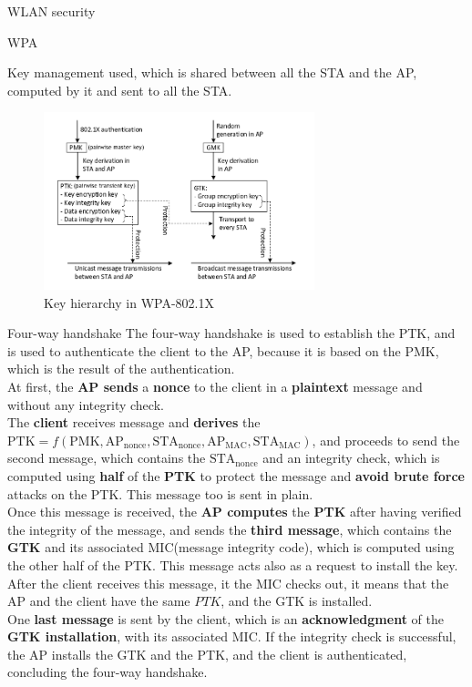 \begin{section}{WLAN security}
\begin{subsection}{WPA}
\begin{subsubsection}{Key management}
      used, which is shared between all the STA and the AP, computed by it and sent to all the STA.
      \begin{figure}[h]
        \centering
        \includegraphics[width=0.7\textwidth]{img/wireless/WPA key hierarchy.png}
        \caption{Key hierarchy in WPA-802.1X}
      \end{figure}
    \end{subsubsection}
    \begin{subsubsection}{Four-way handshake}
      The four-way handshake is used to establish the PTK, and is used to authenticate the client
      to the AP, because it is based on the PMK, which is the result of the authentication.\\
      At first, the \textbf{AP sends} a \textbf{nonce} to the client in a \textbf{plaintext} message
      and without any integrity check.\\
      The \textbf{client} receives message and \textbf{derives} the
      $\text{PTK}=f(\text{PMK},\text{AP}_{\text{nonce}},\text{STA}_{\text{nonce}}
      ,\text{AP}_{\text{MAC}},\text{STA}_{\text{MAC}})$,
      and proceeds to send the second message, which contains the $\text{STA}_{\text{nonce}}$ and an integrity
      check, which is computed using \textbf{half} of the \textbf{PTK} to protect the message and
      \textbf{avoid brute force} attacks on the PTK. This message too is sent in plain.\\
      Once this message is received, the \textbf{AP computes} the \textbf{PTK} after having verified
      the integrity of the message, and sends the \textbf{third message}, which contains the
      \textbf{GTK} and its associated MIC(message integrity code), which is computed using the other
      half of the PTK. This message acts also as a request to install the key. After the client
      receives this message, it the MIC checks out, it means that the AP and the client have the
      same $PTK$, and the GTK is installed.\\
      One \textbf{last message} is sent by the client, which is an \textbf{acknowledgment} of the
      \textbf{GTK installation}, with its associated MIC. If the integrity check is successful, the
      AP installs the GTK and the PTK, and the client is authenticated, concluding the four-way
      handshake.


\end{subsubsection}
\end{subsection}
\end{section}
